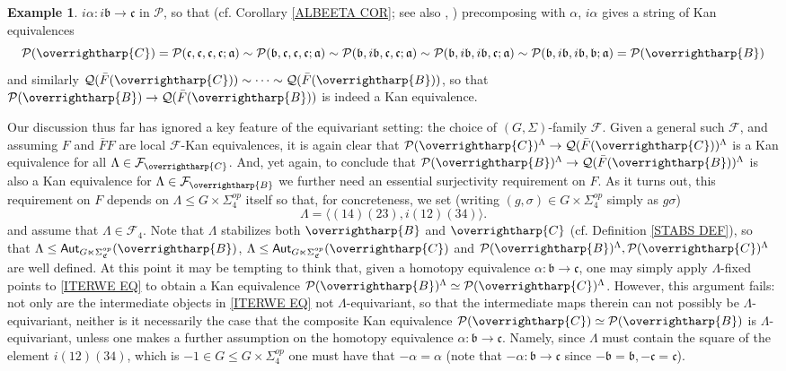\documentclass[a4paper,10pt
,draft
]{article}%
\numberwithin{equation}{section}
\numberwithin{figure}{section}
\theoremstyle{definition} %
\newtheorem{example}[equation]{Example}%
\newcommand{\vect}[1]{\text{\overrightharp{\ensuremath{#1}}}}
\newcommand{\F}{\ensuremath{\mathcal F}}
\renewcommand{\P}{\ensuremath{\mathcal P}}
\newcommand{\1}{\ensuremath{\mathbbm 1}}%
\begin{document}
\begin{example}
$i\alpha \colon i\mathfrak{b} \to \mathfrak{c}$ in $\P$,
so that
(cf. Corollary \ref{ALBEETA COR}; 
see also \cite[Lemma 2.1]{BM13},
\cite[Lemma 4.14]{Cav})
precomposing  
with $\alpha$, $i \alpha$ gives a string of Kan equivalences
\begin{equation}\label{ITERWE EQ}
\P(\vect{C})
=
\P(\mathfrak{c},\mathfrak{c},\mathfrak{c},\mathfrak{c};\mathfrak{a})
\sim 
\P(\mathfrak{b},\mathfrak{c},\mathfrak{c},\mathfrak{c};\mathfrak{a})
\sim
\P(\mathfrak{b},i\mathfrak{b},\mathfrak{c},\mathfrak{c};\mathfrak{a})
\sim
\P(\mathfrak{b},i\mathfrak{b},i\mathfrak{b},\mathfrak{c};\mathfrak{a})
\sim
\P(\mathfrak{b},i\mathfrak{b},i\mathfrak{b},\mathfrak{b};\mathfrak{a})
=
\P(\vect{B})
\end{equation}
and similarly
$\mathcal{Q}(\bar{F}(\vect{C})) 
\sim
\cdots 
\sim
\mathcal{Q}(\bar{F}(\vect{B}))$,
so that
$\P(\vect{B}) \to \mathcal{Q}(\bar{F}(\vect{B}))$
is indeed a Kan equivalence.

Our discussion thus far has ignored a key feature of the equivariant setting: the choice of $(G,\Sigma)$-family $\F$.
Given a general such $\F$, 
and assuming $F$ and $\bar{F} F$ are local $\F$-Kan equivalences,
it is again clear that
$\P(\vect{C})^{\Lambda} \to \mathcal{Q}(\bar{F}(\vect{C}))^{\Lambda}$
is a Kan equivalence for all $\Lambda \in \F_{\vect{C}}$.
%
And, yet again, to conclude that
$\P(\vect{B})^{\Lambda} \to \mathcal{Q}(\bar{F}(\vect{B}))^{\Lambda}$
is also a Kan equivalence for $\Lambda \in \F_{\vect{B}}$ we further need an essential surjectivity requirement on $F$.
As it turns out, this requirement on $F$ depends on 
$\Lambda \leq G \times \Sigma_4^{op}$ itself so that, for concreteness, we set (writing $(g,\sigma) \in G \times \Sigma_4^{op}$ simply as $g\sigma$)
\[
\Lambda = \langle (14)(23), i (12)(34) \rangle.
\]
and assume that $\Lambda \in \F_4$.
Note that $\Lambda$ stabilizes both 
$\vect{B}$ and $\vect{C}$
(cf. Definition \ref{STABS DEF}),
so that 
$\Lambda \leq \mathsf{Aut}_{G \ltimes \Sigma^{op}_{\mathfrak{C}}}(\vect{B})$,
$\Lambda \leq \mathsf{Aut}_{G \ltimes \Sigma^{op}_{\mathfrak{C}}}(\vect{C})$
and $\P(\vect{B})^{\Lambda}, \P(\vect{C})^{\Lambda}$
are well defined.
%
At this point it may be tempting to think that, 
given a homotopy equivalence  
$\alpha \colon \mathfrak{b} \to \mathfrak{c}$,
one may simply apply $\Lambda$-fixed points 
to \eqref{ITERWE EQ}
to obtain a Kan equivalence 
$\P(\vect{B})^{\Lambda} \simeq \P(\vect{C})^{\Lambda}$.
%
However, this argument fails: not only are the intermediate objects
in \eqref{ITERWE EQ} not $\Lambda$-equivariant, so that the intermediate maps therein can not possibly be $\Lambda$-equivariant,
neither is it necessarily the case that the composite Kan equivalence
$\P(\vect{C}) \simeq \P(\vect{B})$ is $\Lambda$-equivariant,
unless one makes a further assumption on the homotopy equivalence
$\alpha\colon \mathfrak{b} \to \mathfrak{c}$.
Namely, since $\Lambda$
must contain the square of the element $i(12)(34)$,
which is $-1 \in G \leq G \times \Sigma_4^{op}$
one must have that 
$-\alpha =\alpha$
(note that $-\alpha \colon \mathfrak{b} \to \mathfrak{c}$
since $-\mathfrak{b}=\mathfrak{b},-\mathfrak{c}=\mathfrak{c}$).


\end{example}
\end{document}
